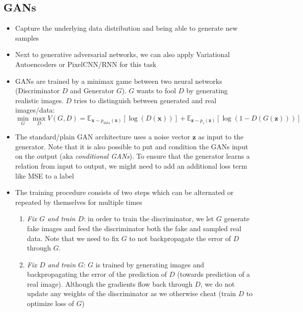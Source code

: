 \subsection{GANs}
\begin{itemize}
	\item Capture the underlying data distribution and being able to generate new samples
	\item Next to generative adversarial networks, we can also apply Variational Autoencoders or PixelCNN/RNN for this task
	\item GANs are trained by a minimax game between two neural networks (Discriminator $D$ and Generator $G$). $G$ wants to fool $D$ by generating realistic images. $D$ tries to distinguish between generated and real images/data:
	$$\min_G \max_D V(G,D) = \mathbb{E}_{\bm{x}\sim p_{\text{data}}(\bm{x})} \left[\log \left(D\left(\bm{x}\right)\right)\right] + \mathbb{E}_{\bm{z}\sim p_{z}(\bm{z})} \left[\log\left(1 - D\left(G\left(\bm{z}\right)\right)\right)\right] $$
	\item The standard/plain GAN architecture uses a noise vector $\bm{z}$ as input to the generator. Note that it is also possible to put  and condition the GANs input on the output (aka \textit{conditional GANs}). To ensure that the generator learns a relation from input to output, we might need to add an additional loss term like MSE to a label
	\item The training procedure consists of two steps which can be alternated or repeated by themselves for multiple times
	\begin{enumerate}
		\item \textit{Fix $G$ and train $D$}: in order to train the discriminator, we let $G$ generate fake images and feed the discriminator both the fake and sampled real data. Note that we need to fix $G$ to not backpropagate the error of $D$ through $G$.
		\item \textit{Fix $D$ and train $G$}: $G$ is trained by generating images and backpropagating the error of the prediction of $D$ (towards prediction of a real image). Although the gradients flow back through $D$, we do not update any weights of the discriminator as we otherwise cheat (train $D$ to optimize loss of $G$)
	\end{enumerate}

\end{itemize}
